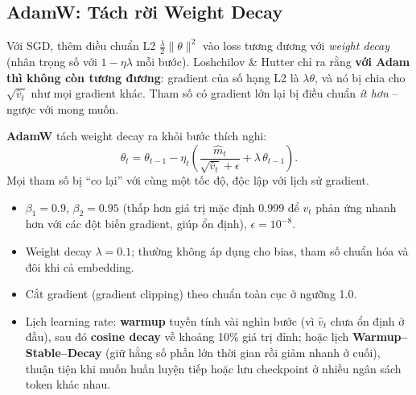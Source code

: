 \subsection{AdamW: Tách rời Weight Decay}
\label{ssec:adamw}
Với SGD, thêm điều chuẩn L2 $\frac{\lambda}{2}\|\theta\|^2$ vào loss tương đương với \emph{weight decay} (nhân trọng số với $1 - \eta\lambda$ mỗi bước). Loshchilov \& Hutter \cite{loshchilov2019adamw} chỉ ra rằng \textbf{với Adam thì không còn tương đương}: gradient của số hạng L2 là $\lambda\theta$, và nó bị chia cho $\sqrt{\hat{v}_t}$ như mọi gradient khác. Tham số có gradient lớn lại bị điều chuẩn \emph{ít hơn} -- ngược với mong muốn.

\textbf{AdamW} tách weight decay ra khỏi bước thích nghi:
\begin{equation}
	\theta_t = \theta_{t-1} - \eta_t\left(\frac{\hat{m}_t}{\sqrt{\hat{v}_t} + \epsilon} + \lambda\,\theta_{t-1}\right).
\end{equation}
Mọi tham số bị “co lại” với cùng một tốc độ, độc lập với lịch sử gradient.

\begin{tcolorbox}[title={Cấu hình AdamW “chuẩn” cho tiền huấn luyện LLM}, colback=blue!5!white, colframe=blue!60!black, fonttitle=\bfseries]
\begin{itemize}
	\item $\beta_1 = 0.9$, $\beta_2 = 0.95$ (thấp hơn giá trị mặc định 0.999 để $v_t$ phản ứng nhanh hơn với các đột biến gradient, giúp ổn định), $\epsilon = 10^{-8}$.
	\item Weight decay $\lambda = 0.1$; thường không áp dụng cho bias, tham số chuẩn hóa và đôi khi cả embedding.
	\item Cắt gradient (gradient clipping) theo chuẩn toàn cục ở ngưỡng 1.0.
	\item Lịch learning rate: \textbf{warmup} tuyến tính vài nghìn bước (vì $\hat{v}_t$ chưa ổn định ở đầu), sau đó \textbf{cosine decay} về khoảng 10\% giá trị đỉnh; hoặc lịch \textbf{Warmup--Stable--Decay} (giữ hằng số phần lớn thời gian rồi giảm nhanh ở cuối), thuận tiện khi muốn huấn luyện tiếp hoặc lưu checkpoint ở nhiều ngân sách token khác nhau.
\end{itemize}
\end{tcolorbox}

